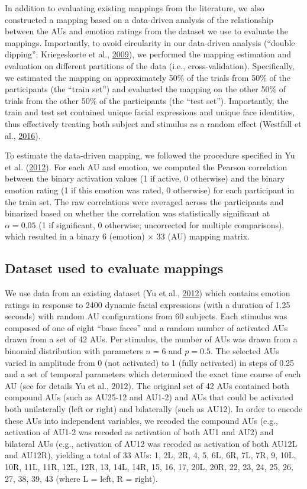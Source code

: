 \documentclass[12pt,american,a4paper,oneside,]{memoir} %
\begin{document}
In addition to evaluating existing mappings from the literature, we also constructed a mapping based on a data-driven analysis of the relationship between the AUs and emotion ratings from the dataset we use to evaluate the mappings. Importantly, to avoid circularity in our data-driven analysis (``double dipping''; Kriegeskorte et al., \protect\hyperlink{ref-kriegeskorte2009circular}{2009}), we performed the mapping estimation and evaluation on different partitions of the data (i.e., cross-validation). Specifically, we estimated the mapping on approximately 50\% of the trials from 50\% of the participants (the ``train set'') and evaluated the mapping on the other 50\% of trials from the other 50\% of the participants (the ``test set''). Importantly, the train and test set contained unique facial expressions and unique face identities, thus effectively treating both subject and stimulus as a random effect (Westfall et al., \protect\hyperlink{ref-westfall2016fixing}{2016}).

To estimate the data-driven mapping, we followed the procedure specified in Yu et al. (\protect\hyperlink{ref-Yu2012-ag}{2012}). For each AU and emotion, we computed the Pearson correlation between the binary activation values (1 if active, 0 otherwise) and the binary emotion rating (1 if this emotion was rated, 0 otherwise) for each participant in the train set. The raw correlations were averaged across the participants and binarized based on whether the correlation was statistically significant at \(\alpha = 0.05\) (1 if significant, 0 otherwise; uncorrected for multiple comparisons), which resulted in a binary 6 (emotion) × 33 (AU) mapping matrix.

\hypertarget{hka-dataset}{%
\subsection{Dataset used to evaluate mappings}\label{hka-dataset}}

We use data from an existing dataset (Yu et al., \protect\hyperlink{ref-Yu2012-ag}{2012}) which contains emotion ratings in response to 2400 dynamic facial expressions (with a duration of 1.25 seconds) with random AU configurations from 60 subjects. Each stimulus was composed of one of eight ``base faces'' and a random number of activated AUs drawn from a set of 42 AUs. Per stimulus, the number of AUs was drawn from a binomial distribution with parameters \(n = 6\) and \(p = 0.5\). The selected AUs varied in amplitude from 0 (not activated) to 1 (fully activated) in steps of 0.25 and a set of temporal parameters which determined the exact time course of each AU (see for details Yu et al., 2012). The original set of 42 AUs contained both compound AUs (such as AU25-12 and AU1-2) and AUs that could be activated both unilaterally (left or right) and bilaterally (such as AU12). In order to encode these AUs into independent variables, we recoded the compound AUs (e.g., activation of AU1-2 was recoded as activation of both AU1 and AU2) and bilateral AUs (e.g., activation of AU12 was recoded as activation of both AU12L and AU12R), yielding a total of 33 AUs: 1, 2L, 2R, 4, 5, 6L, 6R, 7L, 7R, 9, 10L, 10R, 11L, 11R, 12L, 12R, 13, 14L, 14R, 15, 16, 17, 20L, 20R, 22, 23, 24, 25, 26, 27, 38, 39, 43 (where L = left, R = right).
\end{document}
